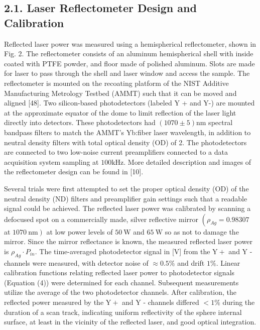 \documentclass[10pt]{article}
\begin{document}
\subsection*{2.1. Laser Reflectometer Design and Calibration}
Reflected laser power was measured using a hemispherical reflectometer, shown in Fig. 2. The reflectometer consists of an aluminum hemispherical shell with inside coated with PTFE powder, and floor made of polished aluminum. Slots are made for laser to pass through the shell and laser window and access the sample. The reflectometer is mounted on the recoating platform of the NIST Additive Manufacturing Metrology Testbed (AMMT) such that it can be moved and aligned [48]. Two silicon-based photodetectors (labeled Y + and Y-) are mounted at the approximate equator of the dome to limit reflection of the laser light directly into detectors. These photodetectors had $(1070 \pm 5) \mathrm{nm}$ spectral bandpass filters to match the AMMT's Yb:fiber laser wavelength, in addition to neutral density filters with total optical density (OD) of 2. The photodetectors are connected to two low-noise current preamplifiers connected to a data acquisition system sampling at $100 \mathrm{kHz}$. More detailed description and images of the reflectometer design can be found in [10].

Several trials were first attempted to set the proper optical density (OD) of the neutral density (ND) filters and preamplifier gain settings such that a readable signal could be achieved. The reflected laser power was calibrated by scanning a defocused spot on a commercially made, silver reflective mirror $\left(\rho_{A g}=0.98307\right.$ at $\left.1070 \mathrm{~nm}\right)$ at low power levels of $50 \mathrm{~W}$ and $65 \mathrm{~W}$ so as not to damage the mirror. Since the mirror reflectance is known, the measured reflected laser power is $\rho_{A g} \cdot P_{i n}$. The time-averaged photodetector signal in [V] from the $\mathrm{Y}+$ and $\mathrm{Y}$ - channels were measured, with detector noise of $\approx 0.5 \%$ and drift $1 \%$. Linear calibration functions relating reflected laser power to photodetector signals (Equation (4)) were determined for each channel. Subsequent measurements utilize the average of the two photodetector channels. After calibration, the reflected power measured by the $\mathrm{Y}+$ and $\mathrm{Y}$ - channels differed $<1 \%$ during the duration of a scan track, indicating uniform reflectivity of the sphere internal surface, at least in the vicinity of the reflected laser, and good optical integration.
\end{document}
